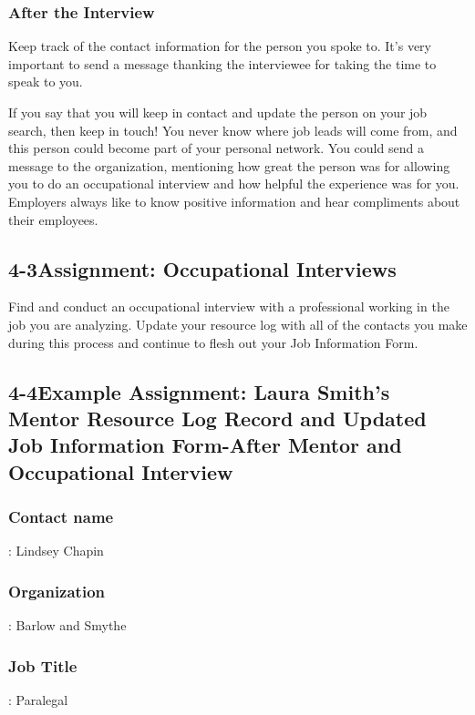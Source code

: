 \subsubsection*{After the Interview}

Keep track of the contact information for the person you spoke to. It's very important to send a message thanking the interviewee for taking the time to speak to you.

If you say that you will keep in contact and update the person on your job search, then keep in touch! You never know where job leads will come from, and this person could become part of your personal network. You could send a message to the organization, mentioning how great the person was for allowing you to do an occupational interview and how helpful the experience was for you. Employers always like to know positive information and hear compliments about their employees.

\pagebreak \subsection*{4-3\quad  Assignment: Occupational Interviews}
Find and conduct an occupational interview with a professional working in the job you are analyzing. Update your resource log with all of the contacts you make during this process and continue to flesh out your Job Information Form.

\pagebreak \subsection*{4-4\quad  Example Assignment: Laura Smith’s Mentor Resource Log Record and Updated Job Information Form-After Mentor and Occupational Interview}

\subsubsection*{Contact name}: Lindsey Chapin

\subsubsection*{Organization}: Barlow and Smythe

\subsubsection*{Job Title}: Paralegal

